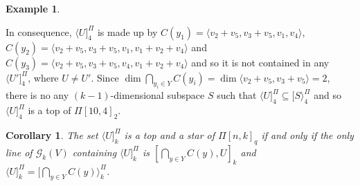 \documentclass[12pt]{article}
\newtheorem{cor}{Corollary}
\theoremstyle{definition}
\newtheorem{exmp}{Example}
\begin{document}
\begin{exmp}
\begin{enumerate}[a)]
                                                      In consequence,  $\langle U]^{\Pi}_{4}$ is made up by  $C(y_1)=\langle v_2+v_5, v_3+v_5, v_1, v_4\rangle$, $C(y_2)=\langle v_2+v_5, v_3+v_5, v_1, v_1+v_2+v_4\rangle$ and $C(y_3)=\langle v_2+v_5, v_3+v_5, v_4, v_1+v_2+v_4\rangle$ and so it is not contained in any $\langle U']^{\Pi}_{4}$, where $U\neq U'$.  Since $\dim\bigcap_{y_i\in Y}C(y_i)=\dim\langle v_2+v_5, v_3+v_5\rangle=2$, there is no any $(k-1)$-dimensional subspace $S$ such that $\langle U]^{\Pi}_{4}\subseteq [S\rangle^{\Pi}_{4}$ and so $\langle U]^{\Pi}_{4}$ is a top of $\Pi[10,4]_{2}$.
  \end{enumerate}
\end{exmp}

\begin{cor}
  The set $\langle U]^{\Pi}_{k}$ is a top and a star of $\Pi[n,k]_{q}$ if and only if the only line of ${\mathcal G}_{k}(V)$ containing $\langle U]^{\Pi}_{k}$
  is $[\bigcap_{y\in Y}C(y), U]_k$ and $\langle U]^{\Pi}_{k}=[\bigcap_{y\in Y}C(y)\rangle^{\Pi}_{k}$.
\end{cor}
\end{document}
